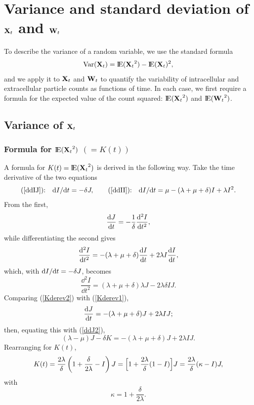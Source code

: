 \section{Variance and standard deviation of ${{\bf X}_t}$ and ${{\bf W}_t}$}
\label{sec:variance}

To describe the variance of a random variable, we use the standard formula
\begin{equation*}
\text{Var}({{\bf X}_t}) = {\rm I}\!{\rm E}({{\bf X}_t}^2) - {\rm I}\!{\rm E}({{\bf X}_t})^2,
\end{equation*}
and we apply it to ${{\bf X}_t}$ and ${{\bf W}_t}$ to quantify the variability of intracellular
and extracellular particle counts as functions of time. In each case, we first
require a formula for the expected value of the count squared: ${\rm I}\!{\rm E}({{\bf X}_t}^2)$
and ${\rm I}\!{\rm E}({{\bf W}_t}^2)$.

\subsection{Variance of ${{\bf X}_t}$}

\subsubsection{Formula for ${\rm I}\!{\rm E}({{\bf X}_t}^2)$ $(=K(t))$}

A formula for $K(t) = {\rm I}\!{\rm E}({{\bf X}_t}^2)$ is derived in the following way. Take the
time derivative of the two equations
$$\text{(\ref{ddIJ}):}\quad {\rm d}I/{\rm d}t = -\delta J,\qquad
\text{(\ref{ddII}):}\quad {\rm d}I/{\rm d}t = \mu - (\lambda + \mu + \delta) I + \lambda I^2.$$
From the first,
\begin{equation}
\label{Kderev1}
\displaystyle\frac{{\rm d} J}{{\rm d} t} = -\frac{1}{\delta}\frac{{\rm d}^2 I}{{\rm d} t^2},
\end{equation}
while differentiating the second gives
$$\frac{{\rm d}^2 I}{{\rm d} t^2} = -(\lambda + \mu + \delta) \displaystyle\frac{{\rm d} I}{{\rm d} t} + 2\lambda I \displaystyle\frac{{\rm d} I}{{\rm d} t},$$
which, with ${\rm d}I/{\rm d}t = -\delta J$, becomes
\begin{equation}
\label{Kderev2}
\frac{\dd^2 I}{\dd t^2} = (\lambda + \mu + \delta)\lambda J- 2\lambda \delta I J.
\end{equation}
Comparing (\ref{Kderev2}) with (\ref{Kderev1}),
$$\displaystyle\frac{{\rm d} J}{{\rm d} t} = -(\lambda + \mu + \delta) J + 2\lambda I J;$$
then, equating this with (\ref{ddJ2}),
$$(\lambda - \mu) J - \delta K = -(\lambda + \mu + \delta) J + 2\lambda I J.$$
Rearranging for $K(t)$,
\begin{equation}
\label{Kt1}
K(t) = \frac{2\lambda}{\delta}\left(1+\frac{\delta}{2\lambda} - I\right) J
= \Bigl[1+\frac{2\lambda}{\delta}(1-I)\Bigr]J
= \frac{2\lambda}{\delta}(\kappa - I)J,
\end{equation}
with
$$\kappa = 1+\frac{\delta}{2\lambda}.$$

